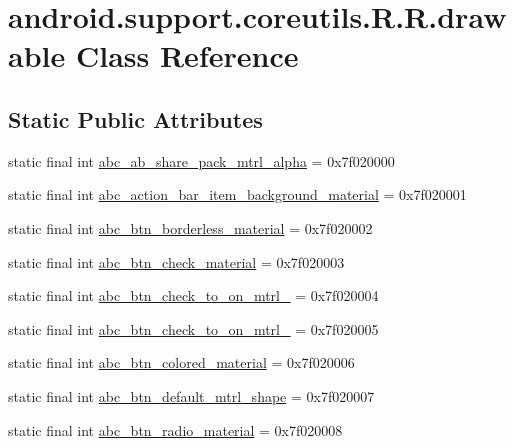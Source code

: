 \hypertarget{classandroid_1_1support_1_1coreutils_1_1_r_1_1drawable}{
\section{android.support.coreutils.R.R.drawable Class Reference}
\label{classandroid_1_1support_1_1coreutils_1_1_r_1_1drawable}
}
\subsection*{Static Public Attributes}
\begin{CompactItemize}
\item 
static final int \hyperlink{classandroid_1_1support_1_1coreutils_1_1_r_1_1drawable_eacd4967d12a28b70ad18e2167850683}{abc\_\-ab\_\-share\_\-pack\_\-mtrl\_\-alpha} = 0x7f020000
\item 
static final int \hyperlink{classandroid_1_1support_1_1coreutils_1_1_r_1_1drawable_d8c18f1cc0f0e4d7d0069e3028a19bf8}{abc\_\-action\_\-bar\_\-item\_\-background\_\-material} = 0x7f020001
\item 
static final int \hyperlink{classandroid_1_1support_1_1coreutils_1_1_r_1_1drawable_c415208f2252c6a28d6c25c9811becc3}{abc\_\-btn\_\-borderless\_\-material} = 0x7f020002
\item 
static final int \hyperlink{classandroid_1_1support_1_1coreutils_1_1_r_1_1drawable_4b8a85b76b1719c9f88467b94506cdf2}{abc\_\-btn\_\-check\_\-material} = 0x7f020003
\item 
static final int \hyperlink{classandroid_1_1support_1_1coreutils_1_1_r_1_1drawable_5a8658754c97b6837934d43a49379e6b}{abc\_\-btn\_\-check\_\-to\_\-on\_\-mtrl\_} = 0x7f020004
\item 
static final int \hyperlink{classandroid_1_1support_1_1coreutils_1_1_r_1_1drawable_2b970e688cd5b8d9da4e466052f204e6}{abc\_\-btn\_\-check\_\-to\_\-on\_\-mtrl\_} = 0x7f020005
\item 
static final int \hyperlink{classandroid_1_1support_1_1coreutils_1_1_r_1_1drawable_9cdf6c27d94f3bd7b274aa5e9f877c04}{abc\_\-btn\_\-colored\_\-material} = 0x7f020006
\item 
static final int \hyperlink{classandroid_1_1support_1_1coreutils_1_1_r_1_1drawable_1541c23156318b3a1f42f873ae9574da}{abc\_\-btn\_\-default\_\-mtrl\_\-shape} = 0x7f020007
\item 
static final int \hyperlink{classandroid_1_1support_1_1coreutils_1_1_r_1_1drawable_cf1f7eaa87c7d1a3198d53ca4766b7b5}{abc\_\-btn\_\-radio\_\-material} = 0x7f020008

\end{CompactItemize}
